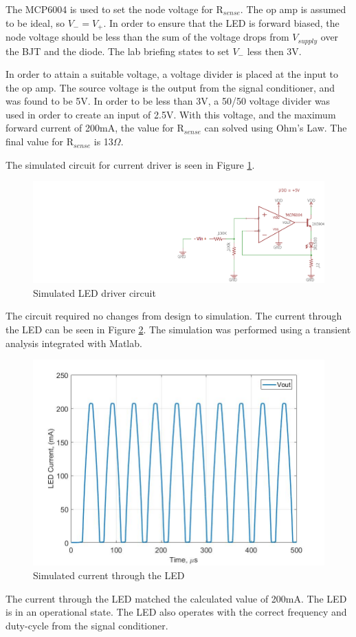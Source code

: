 The MCP6004 is used to set the node voltage for R$_{sense}$. The op amp is assumed to be ideal, so $V_- = V_+$. In order to ensure that the LED is forward biased, the node voltage should be less than the sum of the voltage drops from $V_{supply}$ over the BJT and the diode. The lab briefing \cite{b2} states to set $V_-$ less then 3V.

In order to attain a suitable voltage, a voltage divider is placed at the input to the op amp. The source voltage is the output from the signal conditioner, and was found to be 5V. In order to be less than 3V, a 50/50 voltage divider was used in order to create an input of 2.5V. With this voltage, and the maximum forward current of 200mA, the value for R$_{sense}$ can solved using Ohm's Law. The final value for R$_{sense}$ is 13$\Omega$.

The simulated circuit for current driver is seen in Figure \ref{fig:finalleddriverschem}.

\begin{figure}[H]
	\centering
	\includegraphics[width=0.7\linewidth]{CircuitDevelopment/FinalLEDdriverSChem}
	\caption[Simulated LED driver]{Simulated LED driver circuit}
	\label{fig:finalleddriverschem}
\end{figure}

The circuit required no changes from design to simulation. The current through the LED can be seen in Figure \ref{fig:simcurrentlab4}. The simulation was performed using a transient analysis integrated with Matlab.

\begin{figure}[H]
	\centering
	\includegraphics[width=0.7\linewidth]{CircuitDevelopment/sim_current_lab4}
	\caption[Simulated current]{Simulated current through the LED}
	\label{fig:simcurrentlab4}
\end{figure}

The current through the LED matched the calculated value of 200mA. The LED is in an operational state. The LED also operates with the correct frequency and duty-cycle from the signal conditioner.



